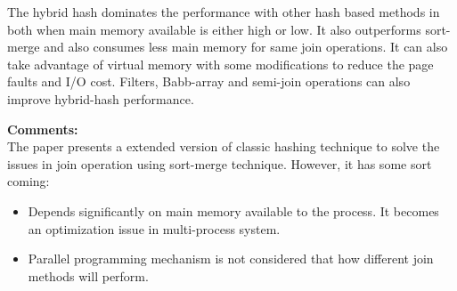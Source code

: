 \documentclass[a4paper,12pt, twoside]{article}
\begin{document}
The hybrid hash dominates the performance with other hash based methods in both when main memory available is either high or low. It also outperforms sort-merge and also consumes less main memory for same join operations. It can also take advantage of virtual memory with some modifications to reduce the page faults and I/O cost. Filters, Babb-array and semi-join operations can also improve hybrid-hash performance.

\textbf{Comments:}\\
The paper presents a extended version of classic hashing technique to solve the issues in join operation using sort-merge technique. However, it has some sort coming:
\begin{itemize}
	\item Depends significantly on main memory available to the process. It becomes an optimization issue in multi-process system.
	
	\item Parallel programming mechanism is not considered that how different join methods will perform.
\end{itemize}
\end{document}
